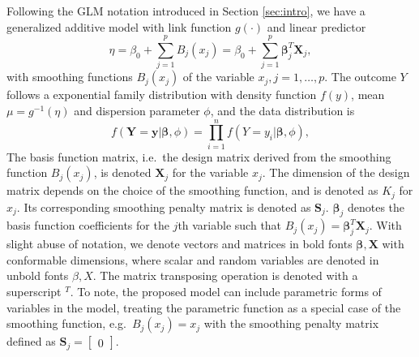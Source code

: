 \documentclass[AMA,STIX1COL,]{WileyNJD-v2}
\begin{document}
Following the GLM notation introduced in Section \ref{sec:intro}, we
have a generalized additive model with link function \(g(\cdot)\) and
linear predictor \begin{equation}\label{eq:gam}
\eta = \beta_0 + \sum\limits^p_{j=1}B_j(x_j) = \beta_0 + \sum\limits^p_{j=1} \boldsymbol{\beta}_j^T \boldsymbol{X}_j,
\end{equation} with smoothing functions \(B_j(x_j)\) of the variable
\(x_j, j = 1, \dots, p.\) The outcome \(Y\) follows a exponential family
distribution with density function \(f(y)\), mean \(\mu = g^{-1}(\eta)\)
and dispersion parameter \(\phi\), and the data distribution is
\begin{equation}
f(\boldsymbol{Y} = \boldsymbol{y}| \boldsymbol{\beta}, \phi) = \prod\limits^n_{i=1}f( Y = y_i|\boldsymbol{\beta}, \phi),\nonumber
\end{equation} The basis function matrix, i.e.~the design matrix derived
from the smoothing function \(B_j(x_j)\), is denoted
\(\boldsymbol{X}_j\) for the variable \(x_j\). The dimension of the
design matrix depends on the choice of the smoothing function, and is
denoted as \(K_j\) for \(x_j\). Its corresponding smoothing penalty
matrix is denoted as \(\boldsymbol{S}_j\). \(\boldsymbol{\beta}_j\)
denotes the basis function coefficients for the \(j\)th variable such
that \(B_j(x_j) = \boldsymbol{\beta}_j^T \boldsymbol{X}_j\). With slight
abuse of notation, we denote vectors and matrices in bold fonts
\(\boldsymbol{\beta}, \boldsymbol{X}\) with conformable dimensions,
where scalar and random variables are denoted in unbold fonts
\(\beta, X\). The matrix transposing operation is denoted with a
superscript \(^T\). To note, the proposed model can include parametric
forms of variables in the model, treating the parametric function as a
special case of the smoothing function, e.g.~\(B_j(x_j) = x_j\) with the
smoothing penalty matrix defined as
\(\boldsymbol{S}_j = \begin{bmatrix}0\end{bmatrix}\).
\end{document}
